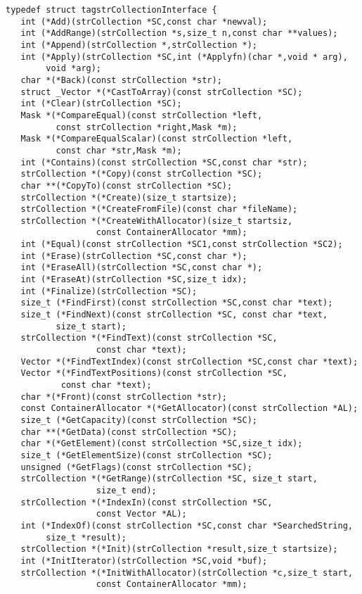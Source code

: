 \begin{verbatim}
typedef struct tagstrCollectionInterface {
   int (*Add)(strCollection *SC,const char *newval);
   int (*AddRange)(strCollection *s,size_t n,const char **values);
   int (*Append)(strCollection *,strCollection *);
   int (*Apply)(strCollection *SC,int (*Applyfn)(char *,void * arg),
        void *arg);
   char *(*Back)(const strCollection *str);
   struct _Vector *(*CastToArray)(const strCollection *SC);
   int (*Clear)(strCollection *SC);
   Mask *(*CompareEqual)(const strCollection *left,
          const strCollection *right,Mask *m);
   Mask *(*CompareEqualScalar)(const strCollection *left,
          const char *str,Mask *m);
   int (*Contains)(const strCollection *SC,const char *str);
   strCollection *(*Copy)(const strCollection *SC);
   char **(*CopyTo)(const strCollection *SC);
   strCollection *(*Create)(size_t startsize);
   strCollection *(*CreateFromFile)(const char *fileName);
   strCollection *(*CreateWithAllocator)(size_t startsiz,
                  const ContainerAllocator *mm);
   int (*Equal)(const strCollection *SC1,const strCollection *SC2);
   int (*Erase)(strCollection *SC,const char *);
   int (*EraseAll)(strCollection *SC,const char *);
   int (*EraseAt)(strCollection *SC,size_t idx);
   int (*Finalize)(strCollection *SC);
   size_t (*FindFirst)(const strCollection *SC,const char *text);
   size_t (*FindNext)(const strCollection *SC, const char *text,
          size_t start);
   strCollection *(*FindText)(const strCollection *SC,
                  const char *text);
   Vector *(*FindTextIndex)(const strCollection *SC,const char *text);
   Vector *(*FindTextPositions)(const strCollection *SC,
           const char *text);
   char *(*Front)(const strCollection *str);
   const ContainerAllocator *(*GetAllocator)(const strCollection *AL);
   size_t (*GetCapacity)(const strCollection *SC);
   char **(*GetData)(const strCollection *SC);
   char *(*GetElement)(const strCollection *SC,size_t idx);
   size_t (*GetElementSize)(const strCollection *SC);
   unsigned (*GetFlags)(const strCollection *SC);
   strCollection *(*GetRange)(strCollection *SC, size_t start,
                  size_t end);
   strCollection *(*IndexIn)(const strCollection *SC,
                  const Vector *AL);
   int (*IndexOf)(const strCollection *SC,const char *SearchedString,
        size_t *result);
   strCollection *(*Init)(strCollection *result,size_t startsize);
   int (*InitIterator)(strCollection *SC,void *buf);
   strCollection *(*InitWithAllocator)(strCollection *c,size_t start,
                  const ContainerAllocator *mm);

\end{verbatim}
